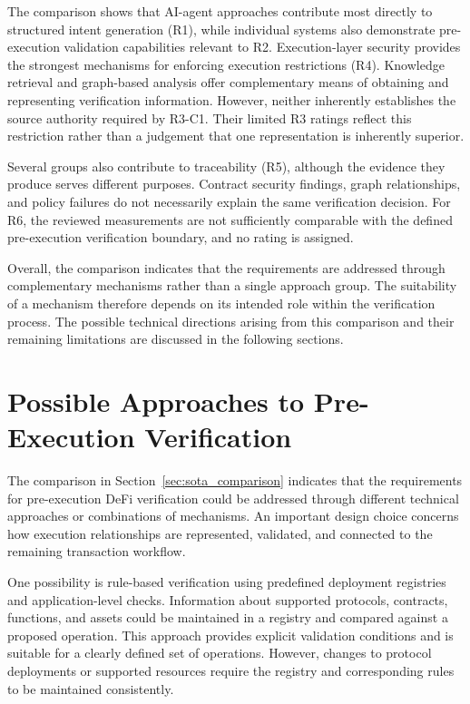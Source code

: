 The comparison shows that AI-agent approaches contribute
most directly to structured intent generation (R1),
while individual systems also demonstrate pre-execution
validation capabilities relevant to R2. Execution-layer
security provides the strongest mechanisms for enforcing
execution restrictions (R4). Knowledge retrieval and
graph-based analysis offer complementary means of obtaining
and representing verification information. However, neither
inherently establishes the source authority required by
R3-C1. Their limited R3 ratings reflect this restriction
rather than a judgement that one representation is
inherently superior.

Several groups also contribute to traceability (R5),
although the evidence they produce serves different
purposes. Contract security findings, graph relationships,
and policy failures do not necessarily explain the same
verification decision. For R6, the reviewed measurements
are not sufficiently comparable with the defined
pre-execution verification boundary, and no rating
is assigned.

Overall, the comparison indicates that the requirements
are addressed through complementary mechanisms rather
than a single approach group. The suitability of a
mechanism therefore depends on its intended role within
the verification process. The possible technical directions arising from this
comparison and their remaining limitations are discussed
in the following sections.



\section{Possible Approaches to Pre-Execution Verification}
\label{sec:sota_alternative_approaches}

The comparison in Section~\ref{sec:sota_comparison} indicates
that the requirements for pre-execution DeFi verification
could be addressed through different technical approaches
or combinations of mechanisms. An important design choice
concerns how execution relationships are represented,
validated, and connected to the remaining transaction
workflow.

One possibility is rule-based verification using predefined
deployment registries and application-level checks.
Information about supported protocols, contracts, functions,
and assets could be maintained in a registry and compared
against a proposed operation. This approach provides explicit
validation conditions and is suitable for a clearly defined
set of operations. However, changes to protocol deployments
or supported resources require the registry and corresponding
rules to be maintained consistently. 

